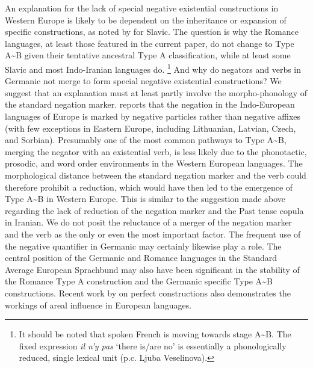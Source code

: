 ﻿\documentclass[output=paper]{langsci/langscibook}
\begin{document}
An explanation for the lack of special negative existential constructions
in Western Europe is likely to be dependent on the inheritance or expansion
of specific constructions, as noted by \citet[1330]{Veselinova2014} for
Slavic. The question is why the Romance languages, at least those featured
in the current paper, do not change to Type A{\textasciitilde}B given their
tentative ancestral Type A classification, while at least some Slavic and
most Indo-Iranian languages do.%
%
\footnote{It should be noted that spoken French is moving towards stage
A{\textasciitilde}B. The fixed expression \textit{il n’y
pas} `there is\slash are no' is essentially a phonologically reduced,
single lexical unit (p.c. Ljuba Veselinova).} 
%
And why do negators and verbs in Germanic not merge to form special
negative existential constructions? We suggest that an explanation must at
least partly involve the morpho-phonology of the standard negation marker.
\citet{Dryer2013} reports that the negation in the Indo-European languages
of Europe is marked by negative particles rather than negative affixes
(with few exceptions in Eastern Europe, including Lithuanian, Latvian,
Czech, and Sorbian). Presumably one of the most common pathways to Type
A{\textasciitilde}B, merging the negator with an existential verb, is less
likely due to the phonotactic, prosodic, and word order environments in the
Western European languages. The morphological distance between the standard
negation marker and the verb could therefore prohibit a reduction, which
would have then led to the emergence of Type A{\textasciitilde}B in Western
Europe. This is similar to the suggestion made above regarding the lack of
reduction of the negation marker and the Past tense copula in Iranian. We
do not posit the reluctance of a merger of the negation marker and the verb
as the only or even the most important factor. The frequent use of the
negative quantifier in Germanic may certainly likewise play a role. The
central position of the Germanic and Romance languages in the Standard
Average European Sprachbund \parencite{Auwera2011} may also have been significant in the stability of the Romance Type A construction and the Germanic specific Type A{\textasciitilde}B constructions. Recent work by \citet{Drinka2017} on perfect constructions also demonstrates the workings of areal influence in European languages.  
\end{document}
